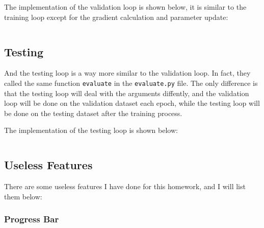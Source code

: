 The implementation of the validation loop is shown below, it is similar to the training loop except for the gradient calculation and parameter update:

\inputminted[firstline=7]{python}{../src/evaluate.py}

\subsection{Testing}

And the testing loop is a way more similar to the validation loop.
In fact, they called the same function \texttt{evaluate} in the \texttt{evaluate.py} file.
The only difference is that the testing loop will deal with the arguments diffently, and the validation loop will be done on the validation dataset each epoch, while the testing loop will be done on the testing dataset after the training process.

The implementation of the testing loop is shown below:

\inputminted[firstline=18,lastline=35]{python}{../src/inference.py}

\subsection{Useless Features}

There are some useless features I have done for this homework, and I will list them below:

\subsubsection{Progress Bar}

